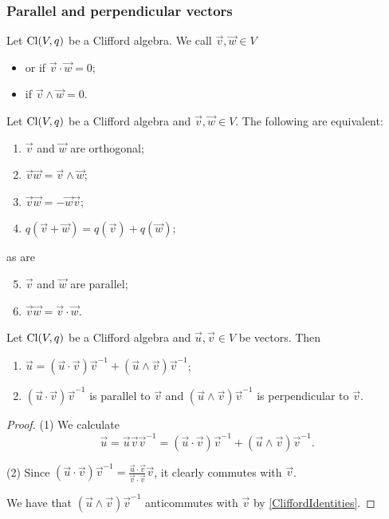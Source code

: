 \subsubsection{Parallel and perpendicular vectors}
\begin{definition}
Let $\operatorname{Cl}(V,q)$ be a Clifford algebra. We call $\vec{v},\vec{w}\in V$
\begin{itemize}
\item {} or  if $\vec{v}\cdot \vec{w} = 0$;
\item {} if $\vec{v}\wedge \vec{w} = 0$.
\end{itemize}
\end{definition}
\begin{lemma}
Let $\operatorname{Cl}(V,q)$ be a Clifford algebra and $\vec{v},\vec{w}\in V$. The following are equivalent:
\begin{enumerate}
\item $\vec{v}$ and $\vec{w}$ are orthogonal;
\item $\vec{v}\vec{w} = \vec{v}\wedge \vec{w}$;
\item $\vec{v}\vec{w} = -\vec{w}\vec{v}$;
\item $q(\vec{v}+\vec{w}) = q(\vec{v})+ q(\vec{w})$;
\end{enumerate}
as are
\begin{enumerate} \setcounter{enumi}{4}
\item $\vec{v}$ and $\vec{w}$ are parallel;
\item $\vec{v}\vec{w} = \vec{v}\cdot \vec{w}$.
\end{enumerate}
\end{lemma}

\begin{lemma}
Let $\operatorname{Cl}(V,q)$ be a Clifford algebra and $\vec{u},\vec{v}\in V$ be vectors. Then
\begin{enumerate}
\item $\vec{u} = (\vec{u}\cdot \vec{v})\vec{v}^{-1} + (\vec{u}\wedge \vec{v})\vec{v}^{-1}$;
\item $(\vec{u}\cdot \vec{v})\vec{v}^{-1}$ is parallel to $\vec{v}$ and $(\vec{u}\wedge \vec{v})\vec{v}^{-1}$ is perpendicular to $\vec{v}$.
\end{enumerate}
\end{lemma}
\begin{proof}
(1) We calculate
\[ \vec{u} = \vec{u}\vec{v}\vec{v}^{-1} = (\vec{u}\cdot \vec{v})\vec{v}^{-1} + (\vec{u}\wedge \vec{v})\vec{v}^{-1}. \]

(2) Since $(\vec{u}\cdot \vec{v})\vec{v}^{-1} = \frac{\vec{u}\cdot \vec{v}}{\vec{v}\cdot \vec{v}}\vec{v}$, it clearly commutes with $\vec{v}$.

We have that $(\vec{u}\wedge \vec{v})\vec{v}^{-1}$ anticommutes with $\vec{v}$ by \ref{CliffordIdentities}.
\end{proof}

